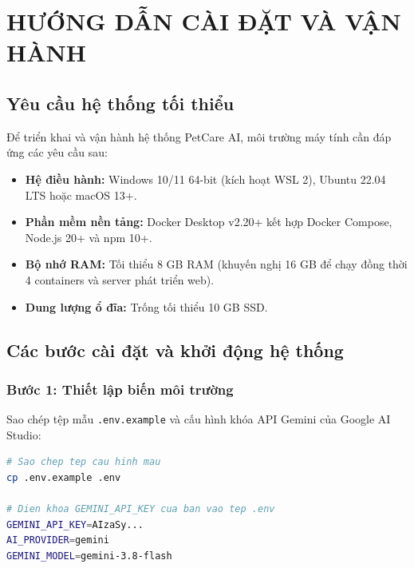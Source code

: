 
\chapter{HƯỚNG DẪN CÀI ĐẶT VÀ VẬN HÀNH}
\label{app:installation}

\section{Yêu cầu hệ thống tối thiểu}

Để triển khai và vận hành hệ thống PetCare AI, môi trường máy tính cần đáp ứng các yêu cầu sau:
\begin{itemize}[leftmargin=1.5cm]
    \item \textbf{Hệ điều hành:} Windows 10/11 64-bit (kích hoạt WSL 2), Ubuntu 22.04 LTS hoặc macOS 13+.
    \item \textbf{Phần mềm nền tảng:} Docker Desktop v2.20+ kết hợp Docker Compose, Node.js 20+ và npm 10+.
    \item \textbf{Bộ nhớ RAM:} Tối thiểu 8 GB RAM (khuyến nghị 16 GB để chạy đồng thời 4 containers và server phát triển web).
    \item \textbf{Dung lượng ổ đĩa:} Trống tối thiểu 10 GB SSD.
\end{itemize}

\section{Các bước cài đặt và khởi động hệ thống}

\subsection{Bước 1: Thiết lập biến môi trường}
Sao chép tệp mẫu \texttt{.env.example} và cấu hình khóa API Gemini của Google AI Studio:
\begin{lstlisting}[language=bash, caption={Tạo tệp cấu hình môi trường}]
# Sao chep tep cau hinh mau
cp .env.example .env

# Dien khoa GEMINI_API_KEY cua ban vao tep .env
GEMINI_API_KEY=AIzaSy...
AI_PROVIDER=gemini
GEMINI_MODEL=gemini-3.8-flash
\end{lstlisting}

